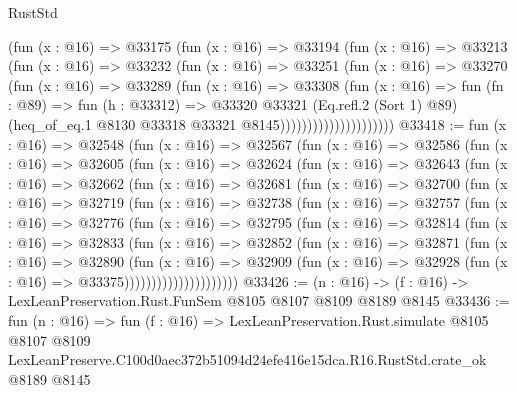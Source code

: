 \begin{lexlean}{RustStd}
\begin{coremodule}
                          (fun (x : @16) =>
                          @33175
                            (fun (x : @16) =>
                            @33194
                              (fun (x : @16) =>
                              @33213
                                (fun (x : @16) =>
                                @33232
                                  (fun (x : @16) =>
                                  @33251
                                    (fun (x : @16) =>
                                    @33270
                                      (fun (x : @16) =>
                                      @33289
                                        (fun (x : @16) =>
                                        @33308
                                          (fun (x : @16) =>
                                          fun (fn : @89) =>
                                          fun (h : @33312) =>
                                          @33320
                                            @33321
                                            (Eq.refl.{2} (Sort 1) @89)
                                            (heq_of_eq.{1}
                                              @8130
                                              @33318
                                              @33321
                                              @8145)))))))))))))))))))))
@33418 := fun (x : @16) =>
  @32548
    (fun (x : @16) =>
    @32567
      (fun (x : @16) =>
      @32586
        (fun (x : @16) =>
        @32605
          (fun (x : @16) =>
          @32624
            (fun (x : @16) =>
            @32643
              (fun (x : @16) =>
              @32662
                (fun (x : @16) =>
                @32681
                  (fun (x : @16) =>
                  @32700
                    (fun (x : @16) =>
                    @32719
                      (fun (x : @16) =>
                      @32738
                        (fun (x : @16) =>
                        @32757
                          (fun (x : @16) =>
                          @32776
                            (fun (x : @16) =>
                            @32795
                              (fun (x : @16) =>
                              @32814
                                (fun (x : @16) =>
                                @32833
                                  (fun (x : @16) =>
                                  @32852
                                    (fun (x : @16) =>
                                    @32871
                                      (fun (x : @16) =>
                                      @32890
                                        (fun (x : @16) =>
                                        @32909
                                          (fun (x : @16) =>
                                          @32928 (fun (x : @16) => @33375)))))))))))))))))))))
@33426 := (n : @16) -> (f : @16) -> LexLeanPreservation.Rust.FunSem @8105 @8107 @8109 @8189 @8145
@33436 := fun (n : @16) =>
  fun (f : @16) =>
  LexLeanPreservation.Rust.simulate
    @8105
    @8107
    @8109
    LexLeanPreserve.C100d0aec372b51094d24efe416e15dca.R16.RustStd.crate_ok
    @8189
    @8145
\end{coremodule}
\end{lexlean}
